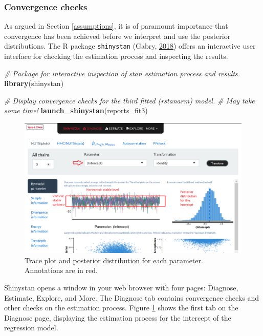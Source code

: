 \documentclass[
  english,
  doc]{apa6}
\newenvironment{Shaded}{\begin{snugshade}}{\end{snugshade}}
\newcommand{\CommentTok}[1]{\textcolor[rgb]{0.56,0.35,0.01}{\textit{#1}}}
\newcommand{\KeywordTok}[1]{\textcolor[rgb]{0.13,0.29,0.53}{\textbf{#1}}}
\newcommand{\NormalTok}[1]{#1}
\begin{document}
\hypertarget{checks}{%
\subsubsection{Convergence checks}\label{checks}}

As argued in Section \ref{assumptions}, it is of paramount importance that convergence has been achieved before we interpret and use the posterior distributions. The R package \texttt{shinystan} (Gabry, \protect\hyperlink{ref-R-shinystan}{2018}) offers an interactive user interface for checking the estimation process and inspecting the results.

\begin{Shaded}
\begin{Highlighting}[]
\CommentTok{\# Package for interactive inspection of stan estimation process and results.}
\KeywordTok{library}\NormalTok{(shinystan) }

\CommentTok{\# Display convergence checks for the third fitted (rstanarm) model.}
\CommentTok{\# May take some time!}
\KeywordTok{launch\_shinystan}\NormalTok{(reports\_fit3)}
\end{Highlighting}
\end{Shaded}

\begin{figure}[H]
\includegraphics[width=1\linewidth]{shinystan1} \caption{Trace plot and posterior distribution for each parameter. Annotations are in red.}\label{fig:shinystanshot1}
\end{figure}

Shinystan opens a window in your web browser with four pages: Diagnose, Estimate, Explore, and More. The Diagnose tab contains convergence checks and other checks on the estimation process. Figure \ref{fig:shinystanshot1} shows the first tab on the Diagnose page, displaying the estimation process for the intercept of the regression model.
\end{document}

